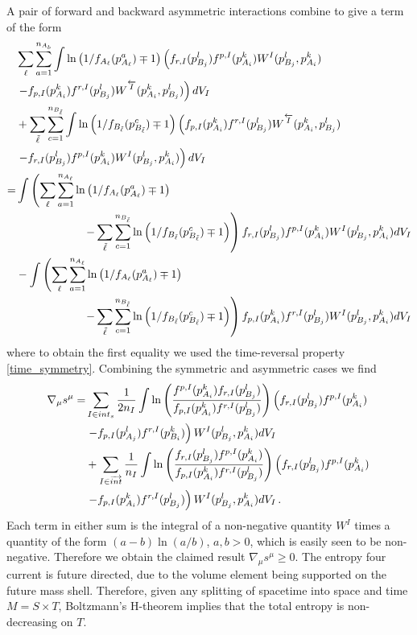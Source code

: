 A pair of forward and backward asymmetric interactions combine to give a term of the form
\begin{align}
&\sum_\ell\sum_{a=1}^{n_{A_b}}\int\ln\left(1/f_{A_\ell}(p_{A_\ell}^a)\mp 1\right)\left(f_{r,I}(p_{B_j}^l)f^{p,I}(p_{A_i}^k)W^I(p_{B_j}^l,p_{A_i}^k) \right.\\
&\left. -f_{p,I}(p_{A_i}^k)f^{r,I}(p_{B_j}^l)W^{\overleftarrow{I}}(p_{A_i}^k,p_{B_j}^l)\right)  dV_I\notag\\
&+\sum_{\tilde\ell}\sum_{c=1}^{n_{B_{\tilde\ell}}} \int\ln\left(1/f_{B_{\tilde\ell}}(p_{B_{\tilde\ell}}^c)\mp 1\right)\left(f_{p,I}(p_{A_i}^k)f^{r,I}(p_{B_j}^l)W^{\overleftarrow{I}}(p_{A_i}^k,p_{B_j}^l) \right.\notag\\
&\left. -f_{r,I}(p_{B_j}^l)f^{p,I}(p_{A_i}^k)W^I(p_{B_j}^l,p_{A_i}^k)\right)  dV_I\notag\\
=&\int\left( \sum_\ell\sum_{a=1}^{n_{A_\ell}}\ln\left(1/f_{A_\ell}(p_{A_\ell}^a)\mp 1\right) \right.\notag\\
&\left.\qquad\qquad\qquad-\sum_{\tilde\ell}\sum_{c=1}^{n_{B_{\tilde\ell}}} \ln\left(1/f_{B_{\tilde\ell}}(p_{B_{\tilde\ell}}^c)\mp 1\right)\right)f_{r,I}(p_{B_j}^l)f^{p,I}(p_{A_i}^k)W^I(p_{B_j}^l,p_{A_i}^k)  dV_I\notag\\
&-\int \left(\sum_\ell\sum_{a=1}^{n_{A_\ell}}\ln\left(1/f_{A_\ell}(p_{A_\ell}^a)\mp 1\right) \right.\notag\\
&\left.\qquad\qquad\qquad-\sum_{\tilde\ell}\sum_{c=1}^{n_{B_{\tilde\ell}}} \ln\left(1/f_{B_{\tilde\ell}}(p_{B_{\tilde\ell}}^c)\mp 1\right)\right)f_{p,I}(p_{A_i}^k)f^{r,I}(p_{B_j}^l)W^{I}(p_{B_j}^l,p_{A_i}^k)  dV_I\notag\\
\end{align}
where  to obtain the first equality we  used  the time-reversal property  \eqref{time_symmetry}.  Combining the symmetric and asymmetric cases we find
\begin{align}
\nabla_\mu s^\mu=&\sum_{I\in int_s} \frac{1}{2n_I}\int\ln\left(\frac{f^{p,I}(p_{A_i}^k)f_{r,I}(p_{B_j}^l)}{f_{p,I}(p_{A_i}^k)f^{r,I}(p_{B_j}^l)}\right)\left( f_{r,I}(p_{B_j}^l)f^{p,I}(p_{A_i}^k)\right.\\
&\left.- f_{p,I}(p_{A_j}^l)f^{r,I}(p_{B_i}^k)\right)W^I(p_{B_j}^l,p_{A_i}^k) dV_I\notag\\
&+\sum_{I\in \overrightarrow{int}}\frac{1}{n_I}\int\ln\left(\frac{f_{r,I}(p_{B_j}^l)f^{p,I}(p_{A_i}^k)}{f_{p,I}(p_{A_i}^k)f^{r,I}(p_{B_j}^l)}\right)\left(f_{r,I}(p_{B_j}^l)f^{p,I}(p_{A_i}^k)\right.\notag\\
&\left.-f_{p,I}(p_{A_i}^k)f^{r,I}(p_{B_j}^l)\right)W^I(p_{B_j}^l,p_{A_i}^k)  dV_I\notag\,.
\end{align}
Each term in either sum is the integral of a non-negative quantity $W^{I}$ times a quantity of the form $(a-b)\ln(a/b)$, $a,b>0$, which is easily seen to be non-negative.  Therefore we obtain the claimed result $\nabla_\mu s^\mu\geq 0$.  The entropy four current is future directed, due to the volume element being supported on the future mass shell. Therefore, given any splitting of spacetime into space and time $M=S\times T$,   Boltzmann's H-theorem implies that the total entropy  is non-decreasing on $T$.


